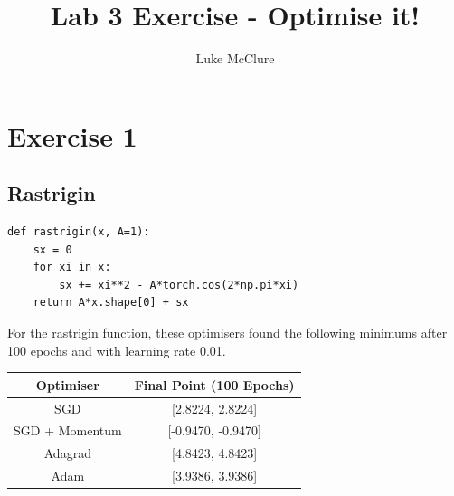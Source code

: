 \documentclass[sigconf]{acmart}
\begin{document}
\title{Lab 3 Exercise - Optimise it!}
\author{Luke McClure}

\maketitle
\pagestyle{myheadings}
\section{Exercise 1}
\subsection{Rastrigin}
\begin{listing}[H]
    \begin{verbatim}
def rastrigin(x, A=1):
    sx = 0
    for xi in x:
        sx += xi**2 - A*torch.cos(2*np.pi*xi)
    return A*x.shape[0] + sx
\end{verbatim}
\end{listing}
For the rastrigin function, these optimisers found the following minimums after 100 epochs and with learning rate 0.01.

\begin{center}
    \begin{tabular}{| c c |}
        \hline
        Optimiser & Final Point (100 Epochs) \\ 
        \hline\hline
        SGD & [2.8224, 2.8224] \\
        SGD + Momentum & [-0.9470, -0.9470]\\
        Adagrad & [4.8423, 4.8423]\\
        Adam & [3.9386, 3.9386]\\
        \hline      
    \end{tabular}
\end{center}
\end{document}
